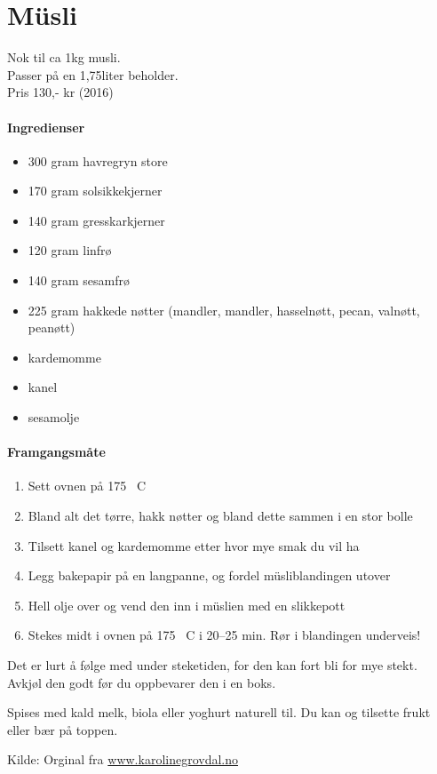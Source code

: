 \section{﻿Müsli}
Nok til ca 1kg musli.\\ Passer på en 1,75liter beholder.\\
Pris 130,- kr (2016)

\paragraph{Ingredienser}
\begin{itemize}[noitemsep]
  \item 300 gram havregryn store
  \item 170 gram solsikkekjerner
  \item 140 gram gresskarkjerner
  \item 120 gram linfrø
  \item 140 gram sesamfrø
  \item 225 gram hakkede nøtter (mandler, mandler, hasselnøtt, pecan, valnøtt, peanøtt)
  \item kardemomme
  \item kanel
  \item sesamolje
\end{itemize}

\paragraph{Framgangsmåte}
\begin{enumerate}[noitemsep]
  \item	Sett ovnen på 175 \degree~C
  \item	Bland alt det tørre, hakk nøtter og bland dette sammen i en stor bolle
  \item	Tilsett kanel og kardemomme etter hvor mye smak du vil ha
  \item	Legg bakepapir på en langpanne, og fordel müsliblandingen utover
  \item	Hell olje over og vend den inn i müslien med en slikkepott
  \item	Stekes midt i ovnen på 175 \degree~C i 20--25 min. Rør i blandingen underveis!
\end{enumerate}


Det er lurt å følge med under steketiden, for den kan fort bli for mye stekt.
Avkjøl den godt før du oppbevarer den i en boks.

Spises med kald melk, biola eller yoghurt naturell til. Du kan og tilsette frukt eller bær på toppen.

Kilde: Orginal fra \href{http://www.karolinegrovdal.no/?p=305}{www.karolinegrovdal.no}
